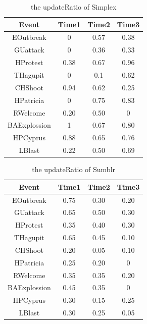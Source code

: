 \documentclass{llncs}
\begin{document}
\begin{table}[htp]\label{table:update 0f simplex}
\caption{the updateRatio of Simplex}
\begin{center}
\begin{tabular}{|c|c|c|c|}
    \hline
    Event & Time1 & Time2 & Time3 \\
    \hline
    EOutbreak & 0 & 0.57 & 0.38 \\
    \hline
    GUattack & 0 & 0.36 & 0.33 \\
    \hline
    HProtest & 0.38 & 0.67 & 0.96 \\
    \hline
    THagupit & 0 & 0.1 & 0.62\\
    \hline
    CHShoot & 0.94 & 0.62 & 0.25\\
    \hline
    HPatricia & 0 & 0.75 & 0.83\\
    \hline
    RWelcome & 0.20 & 0.50 & 0\\
    \hline
    BAExplossion & 1 & 0.67 & 0.80\\
    \hline
    HPCyprus & 0.88 & 0.65 & 0.76\\
    \hline
    LBlast & 0.22 & 0.50 & 0.69\\
    \hline
\end{tabular}
\end{center}
\label{default}
\end{table}

\begin{table}[htp]\label{table:update 0f sumblr}
\caption{the updateRatio of Sumblr}
\begin{center}
\begin{tabular}{|c|c|c|c|}
    \hline
    Event & Time1 & Time2 & Time3 \\
    \hline
    EOutbreak & 0.75 & 0.30 & 0.20 \\
    \hline
    GUattack & 0.65 & 0.50 & 0.30 \\
    \hline
    HProtest & 0.35 & 0.40 & 0.30 \\
    \hline
    THagupit & 0.65 & 0.45 & 0.10\\
    \hline
    CHShoot & 0.20 & 0.05 & 0.10\\
    \hline
    HPatricia & 0.25 & 0.20 & 0\\
    \hline
    RWelcome & 0.35 & 0.35 & 0.20\\
    \hline
    BAExplossion & 0.45 & 0.35 & 0\\
    \hline
    HPCyprus & 0.30 & 0.15 & 0.25\\
    \hline
    LBlast & 0.30 & 0.25 & 0.05\\
    \hline
\end{tabular}
\end{center}
\label{default}
\end{table}
\end{document}
